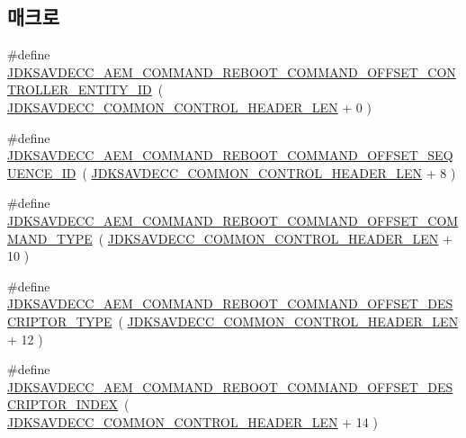 \subsection*{매크로}
\begin{DoxyCompactItemize}
\item 
\#define \hyperlink{group__command__reboot_gadab4c888de0be05f0397e84f99570994}{J\+D\+K\+S\+A\+V\+D\+E\+C\+C\+\_\+\+A\+E\+M\+\_\+\+C\+O\+M\+M\+A\+N\+D\+\_\+\+R\+E\+B\+O\+O\+T\+\_\+\+C\+O\+M\+M\+A\+N\+D\+\_\+\+O\+F\+F\+S\+E\+T\+\_\+\+C\+O\+N\+T\+R\+O\+L\+L\+E\+R\+\_\+\+E\+N\+T\+I\+T\+Y\+\_\+\+ID}~( \hyperlink{group__jdksavdecc__avtp__common__control__header_gaae84052886fb1bb42f3bc5f85b741dff}{J\+D\+K\+S\+A\+V\+D\+E\+C\+C\+\_\+\+C\+O\+M\+M\+O\+N\+\_\+\+C\+O\+N\+T\+R\+O\+L\+\_\+\+H\+E\+A\+D\+E\+R\+\_\+\+L\+EN} + 0 )
\item 
\#define \hyperlink{group__command__reboot_gacbc4099bde73985c48b07d6cd8b7db2a}{J\+D\+K\+S\+A\+V\+D\+E\+C\+C\+\_\+\+A\+E\+M\+\_\+\+C\+O\+M\+M\+A\+N\+D\+\_\+\+R\+E\+B\+O\+O\+T\+\_\+\+C\+O\+M\+M\+A\+N\+D\+\_\+\+O\+F\+F\+S\+E\+T\+\_\+\+S\+E\+Q\+U\+E\+N\+C\+E\+\_\+\+ID}~( \hyperlink{group__jdksavdecc__avtp__common__control__header_gaae84052886fb1bb42f3bc5f85b741dff}{J\+D\+K\+S\+A\+V\+D\+E\+C\+C\+\_\+\+C\+O\+M\+M\+O\+N\+\_\+\+C\+O\+N\+T\+R\+O\+L\+\_\+\+H\+E\+A\+D\+E\+R\+\_\+\+L\+EN} + 8 )
\item 
\#define \hyperlink{group__command__reboot_gae33425fbbaa158de4cdfb8b146832968}{J\+D\+K\+S\+A\+V\+D\+E\+C\+C\+\_\+\+A\+E\+M\+\_\+\+C\+O\+M\+M\+A\+N\+D\+\_\+\+R\+E\+B\+O\+O\+T\+\_\+\+C\+O\+M\+M\+A\+N\+D\+\_\+\+O\+F\+F\+S\+E\+T\+\_\+\+C\+O\+M\+M\+A\+N\+D\+\_\+\+T\+Y\+PE}~( \hyperlink{group__jdksavdecc__avtp__common__control__header_gaae84052886fb1bb42f3bc5f85b741dff}{J\+D\+K\+S\+A\+V\+D\+E\+C\+C\+\_\+\+C\+O\+M\+M\+O\+N\+\_\+\+C\+O\+N\+T\+R\+O\+L\+\_\+\+H\+E\+A\+D\+E\+R\+\_\+\+L\+EN} + 10 )
\item 
\#define \hyperlink{group__command__reboot_gaccba5ac78eab3d96a48416a0ac9806a1}{J\+D\+K\+S\+A\+V\+D\+E\+C\+C\+\_\+\+A\+E\+M\+\_\+\+C\+O\+M\+M\+A\+N\+D\+\_\+\+R\+E\+B\+O\+O\+T\+\_\+\+C\+O\+M\+M\+A\+N\+D\+\_\+\+O\+F\+F\+S\+E\+T\+\_\+\+D\+E\+S\+C\+R\+I\+P\+T\+O\+R\+\_\+\+T\+Y\+PE}~( \hyperlink{group__jdksavdecc__avtp__common__control__header_gaae84052886fb1bb42f3bc5f85b741dff}{J\+D\+K\+S\+A\+V\+D\+E\+C\+C\+\_\+\+C\+O\+M\+M\+O\+N\+\_\+\+C\+O\+N\+T\+R\+O\+L\+\_\+\+H\+E\+A\+D\+E\+R\+\_\+\+L\+EN} + 12 )
\item 
\#define \hyperlink{group__command__reboot_gaf8a3609415ba0d2f594aeb701dac10f2}{J\+D\+K\+S\+A\+V\+D\+E\+C\+C\+\_\+\+A\+E\+M\+\_\+\+C\+O\+M\+M\+A\+N\+D\+\_\+\+R\+E\+B\+O\+O\+T\+\_\+\+C\+O\+M\+M\+A\+N\+D\+\_\+\+O\+F\+F\+S\+E\+T\+\_\+\+D\+E\+S\+C\+R\+I\+P\+T\+O\+R\+\_\+\+I\+N\+D\+EX}~( \hyperlink{group__jdksavdecc__avtp__common__control__header_gaae84052886fb1bb42f3bc5f85b741dff}{J\+D\+K\+S\+A\+V\+D\+E\+C\+C\+\_\+\+C\+O\+M\+M\+O\+N\+\_\+\+C\+O\+N\+T\+R\+O\+L\+\_\+\+H\+E\+A\+D\+E\+R\+\_\+\+L\+EN} + 14 )

\end{DoxyCompactItemize}

